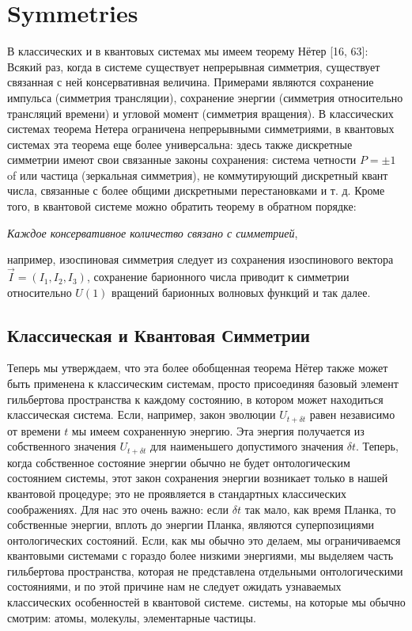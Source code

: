 \documentclass[main.tex]{subfiles}
\begin{document}
\section{Symmetries}\label{ch18}

В классических и в квантовых системах мы имеем теорему Нётер [16, 63]:
Всякий раз, когда в системе существует непрерывная симметрия, существует связанная с ней консервативная величина.
Примерами являются сохранение импульса (симметрия трансляции), сохранение энергии (симметрия относительно трансляций времени) и угловой момент (симметрия вращения). В классических системах теорема Нетера ограничена непрерывными симметриями, в квантовых системах эта теорема еще более универсальна: здесь также дискретные симметрии имеют свои связанные законы сохранения: система четности $P = \pm 1$ of или частица (зеркальная симметрия), не коммутирующий дискретный квант числа, связанные с более общими дискретными перестановками и т. д. Кроме того, в квантовой системе можно обратить теорему в обратном порядке:

\textit{Каждое консервативное количество связано с симметрией},

например, изоспиновая симметрия следует из сохранения изоспинового вектора $\vec I = (I_1, I_2, I_3)$, сохранение барионного числа приводит к симметрии относительно $U (1)$ вращений барионных волновых функций и так далее.


\subsection{Классическая и Квантовая Симметрии}\label{ch18.1}

Теперь мы утверждаем, что эта более обобщенная теорема Нётер также может быть применена к классическим системам, просто присоединяя базовый элемент гильбертова пространства к каждому состоянию, в котором может находиться классическая система. Если, например, закон эволюции $U_{t + \delta t}$ равен независимо от времени $t$ мы имеем сохраненную энергию. Эта энергия получается из собственного значения $U_{t + \delta t}$ для наименьшего допустимого значения $\delta t$. Теперь, когда собственное состояние энергии обычно не будет онтологическим состоянием системы, этот закон сохранения энергии возникает только в нашей квантовой процедуре; это не проявляется в стандартных классических соображениях. Для нас это очень важно: если $\delta t$ так мало, как время Планка, то собственные энергии, вплоть до энергии Планка, являются суперпозициями
онтологических состояний. Если, как мы обычно это делаем, мы ограничиваемся квантовыми системами с гораздо более низкими энергиями, мы выделяем часть гильбертова пространства, которая не представлена отдельными онтологическими состояниями, и по этой причине нам не следует ожидать узнаваемых классических особенностей в квантовой системе. системы, на которые мы обычно смотрим: атомы, молекулы, элементарные частицы.
\end{document}
